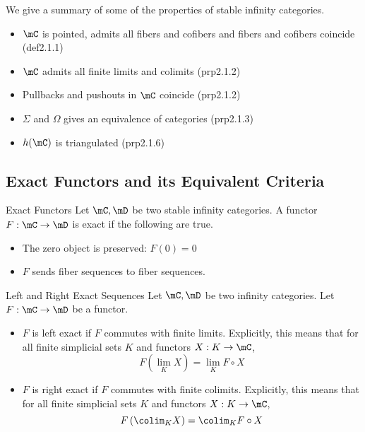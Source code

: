 \documentclass[a4paper]{article}
\begin{document}
We give a summary of some of the properties of stable infinity categories. 
\begin{itemize}
\item $\mC$ is pointed, admits all fibers and cofibers and fibers and cofibers coincide (def2.1.1)
\item $\mC$ admits all finite limits and colimits (prp2.1.2)
\item Pullbacks and pushouts in $\mC$ coincide (prp2.1.2)
\item $\Sigma$ and $\Omega$ gives an equivalence of categories (prp2.1.3)
\item $h(\mC)$ is triangulated (prp2.1.6)
\end{itemize}

\subsection{Exact Functors and its Equivalent Criteria}
\begin{defn}{Exact Functors}{} Let $\mC,\mD$ be two stable infinity categories. A functor $F:\mC\to\mD$ is exact if the following are true. 
\begin{itemize}
\item The zero object is preserved: $F(0)=0$
\item $F$ sends fiber sequences to fiber sequences. 
\end{itemize}
\end{defn}

\begin{defn}{Left and Right Exact Sequences}{} Let $\mC,\mD$ be two infinity categories. Let $F:\mC\to\mD$ be a functor. 
\begin{itemize}
\item $F$ is left exact if $F$ commutes with finite limits. Explicitly, this means that for all finite simplicial sets $K$ and functors $X:K\to\mC$, $$F\left(\lim_K X\right)=\lim_K F\circ X$$
\item $F$ is right exact if $F$ commutes with finite colimits. Explicitly, this means that for all finite simplicial sets $K$ and functors $X:K\to\mC$, $$F\left(\colim_K X\right)=\colim_K F\circ X$$
\end{itemize}
\end{defn}
\end{document}
